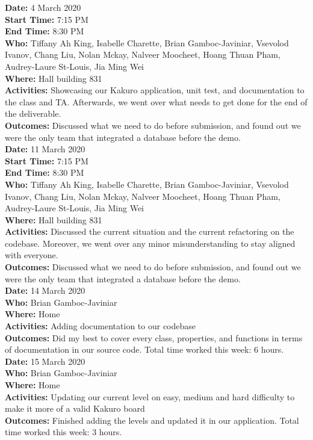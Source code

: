 \documentclass[12pt]{article}
\begin{document}
{\bf Date:} 4 March 2020\\
{\bf Start Time:} 7:15 PM\\
{\bf End Time:} 8:30 PM \\
{\bf Who:} Tiffany Ah King, Isabelle Charette, Brian Gamboc-Javiniar, Vsevolod Ivanov, Chang Liu, Nolan Mckay, Nalveer Moocheet, Hoang Thuan Pham, Audrey-Laure St-Louis, Jia Ming Wei\\
{\bf Where:} Hall building 831 \\
{\bf Activities:} Showcasing our Kakuro application, unit test, and documentation to the class and TA. Afterwards, we went over what needs to get done for the end of the deliverable. \\
{\bf Outcomes:} Discussed what we need to do before submission, and found out we were the only team that integrated a database before the demo. \\

{\bf Date:} 11 March 2020\\
{\bf Start Time:} 7:15 PM\\
{\bf End Time:} 8:30 PM \\
{\bf Who:} Tiffany Ah King, Isabelle Charette, Brian Gamboc-Javiniar, Vsevolod Ivanov, Chang Liu, Nolan Mckay, Nalveer Moocheet, Hoang Thuan Pham, Audrey-Laure St-Louis, Jia Ming Wei\\
{\bf Where:} Hall building 831 \\
{\bf Activities:} Discussed the current situation and the current refactoring on the codebase. Moreover, we went over any minor misunderstanding to stay aligned with everyone. \\
{\bf Outcomes:} Discussed what we need to do before submission, and found out we were the only team that integrated a database before the demo. \\

{\bf Date:} 14 March 2020 \\
{\bf Who:} Brian Gamboc-Javiniar \\
{\bf Where:} Home \\
{\bf Activities:} Adding documentation to our codebase \\
{\bf Outcomes:} Did my best to cover every class, properties, and functions in terms of documentation in our source code. Total time worked this week: 6 hours. \\

{\bf Date:} 15 March 2020 \\
{\bf Who:} Brian Gamboc-Javiniar \\
{\bf Where:} Home \\
{\bf Activities:} Updating our current level on easy, medium and hard difficulty to make it more of a valid Kakuro board \\
{\bf Outcomes:} Finished adding the levels and updated it in our application. Total time worked this week: 3 hours. \\


\end{document}
